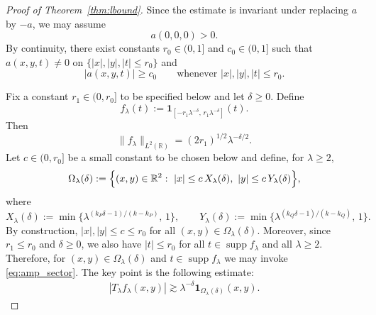 \documentclass[10pt,a4paper]{amsart}
\newcommand{\R}{\mathbb{R}}
\newcommand{\supp}{\operatorname{supp}}
\begin{document}
	\begin{proof}[Proof of Theorem~\ref{thm:lbound}]

		Since the estimate is invariant under replacing $a$ by $-a$,
        we may assume
        \[
        a(0,0,0)>0.
        \]
		By continuity, there exist constants $r_0\in(0,1]$ and $c_0\in(0,1]$ such that
		$a(x,y,t)\neq0$ on $\{|x|,|y|,|t|\le r_0\}$ and
		\begin{equation}\label{eq:amp_sector}
			|a(x,y,t)|\ge c_0
			\qquad\text{whenever }|x|,|y|,|t|\le r_0.
		\end{equation}
		
		Fix a constant $r_1\in(0,r_0]$ to be specified below and let $\delta\ge 0$.
		Define
		\begin{equation*}
			f_\lambda(t):=\mathbf{1}_{[-r_1\lambda^{-\delta},\,r_1\lambda^{-\delta}]}(t).
		\end{equation*}
		Then
		\begin{equation}\label{eq:test_L2_norm}
			\|f_\lambda\|_{L^2(\R)}=(2r_1)^{1/2}\lambda^{-\delta/2}.
		\end{equation}
		Let $c\in(0,r_0]$ be a small constant to be chosen below and define, for $\lambda\ge 2$,
		\begin{equation}\label{eq:Omega_def}
			\Omega_\lambda(\delta)
			:=\Bigl\{(x,y)\in\R^2:\ |x|\le c\,X_\lambda(\delta),\ |y|\le c\,Y_\lambda(\delta)\Bigr\},
		\end{equation}
		where
		\begin{equation}\label{eq:XY_def}
			X_\lambda(\delta):=\min\{\lambda^{(k_P\delta-1)/(k-k_P)},\,1\},\qquad
			Y_\lambda(\delta):=\min\{\lambda^{(k_Q\delta-1)/(k-k_Q)},\,1\}.
		\end{equation}
		By construction, $|x|,|y|\le c\le r_0$ for all $(x,y)\in\Omega_\lambda(\delta)$.
		Moreover, since $r_1\le r_0$ and $\delta\ge0$, we also have $|t|\le r_0$ for all
		$t\in\supp f_\lambda$ and all $\lambda\ge2$.
		Therefore, for $(x,y)\in\Omega_\lambda(\delta)$ and $t\in\supp f_\lambda$ we may invoke
		\eqref{eq:amp_sector}.
		The key point is the following estimate:
		\begin{align}\label{T:lbound}
			|T_\lambda f_\lambda(x,y)| \gtrsim \lambda^{-\delta} \mathbf{1}_{\Omega_\lambda(\delta)}(x,y).
		\end{align}
		


\end{proof}
\end{document}

